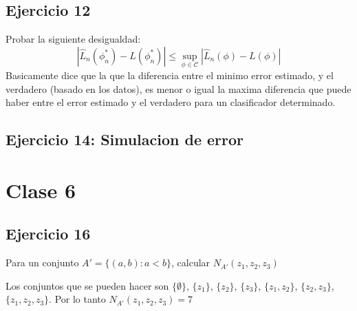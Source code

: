 \documentclass[12pt, a4paper]{article}
\begin{document}
\subsection{Ejercicio 12}
Probar la siguiente desigualdad:
		$$|\widehat{L}_n(\phi_n^*)-L(\phi_n^*)| \leq \sup\limits_{\phi \in \mathscr{C}}|\widehat{L}_n(\phi)-L(\phi)| $$
Basicamente dice que la que la diferencia entre el minimo error estimado, y el verdadero (basado en los datos), es menor  o igual la maxima diferencia que puede haber entre el error estimado y el verdadero para un clasificador determinado.
\subsection{Ejercicio 14: Simulacion de error}

\section{Clase 6}
\subsection{Ejercicio 16}
Para un conjunto $A' = \{(a,b): a<b \}$, calcular $N_{A'}(z_1,z_2,z_3)$

Los conjuntos que se pueden hacer son $\{\emptyset\}$, $\{z_1\}$, $\{z_2\}$, $\{z_3\}$, $\{z_1,z_2\}$, $\{z_2,z_3\}$, $\{z_1, z_2, z_3\}$. Por lo tanto $N_{A'}(z_1,z_2,z_3) = 7$
\end{document}
